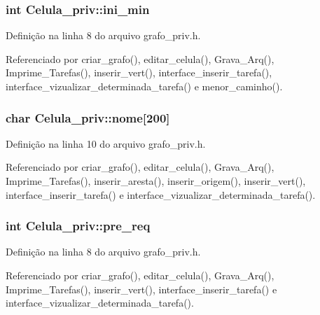 \subsubsection[{ini\+\_\+min}]{\setlength{\rightskip}{0pt plus 5cm}int Celula\+\_\+priv\+::ini\+\_\+min}\label{structCelula__priv_a3c49601fe078bd7bb1512f0107af5301}


Definição na linha 8 do arquivo grafo\+\_\+priv.\+h.



Referenciado por criar\+\_\+grafo(), editar\+\_\+celula(), Grava\+\_\+\+Arq(), Imprime\+\_\+\+Tarefas(), inserir\+\_\+vert(), interface\+\_\+inserir\+\_\+tarefa(), interface\+\_\+vizualizar\+\_\+determinada\+\_\+tarefa() e menor\+\_\+caminho().

\hypertarget{structCelula__priv_a7f33fa72aceed7b44922f0f39d6f7f59}{}
\subsubsection[{nome}]{\setlength{\rightskip}{0pt plus 5cm}char Celula\+\_\+priv\+::nome\mbox{[}200\mbox{]}}\label{structCelula__priv_a7f33fa72aceed7b44922f0f39d6f7f59}


Definição na linha 10 do arquivo grafo\+\_\+priv.\+h.



Referenciado por criar\+\_\+grafo(), editar\+\_\+celula(), Grava\+\_\+\+Arq(), Imprime\+\_\+\+Tarefas(), inserir\+\_\+aresta(), inserir\+\_\+origem(), inserir\+\_\+vert(), interface\+\_\+inserir\+\_\+tarefa() e interface\+\_\+vizualizar\+\_\+determinada\+\_\+tarefa().

\hypertarget{structCelula__priv_a3ff8d3c4d0ba994771391320203619fc}{}
\subsubsection[{pre\+\_\+req}]{\setlength{\rightskip}{0pt plus 5cm}int Celula\+\_\+priv\+::pre\+\_\+req}\label{structCelula__priv_a3ff8d3c4d0ba994771391320203619fc}


Definição na linha 8 do arquivo grafo\+\_\+priv.\+h.



Referenciado por criar\+\_\+grafo(), editar\+\_\+celula(), Grava\+\_\+\+Arq(), Imprime\+\_\+\+Tarefas(), inserir\+\_\+vert(), interface\+\_\+inserir\+\_\+tarefa() e interface\+\_\+vizualizar\+\_\+determinada\+\_\+tarefa().

